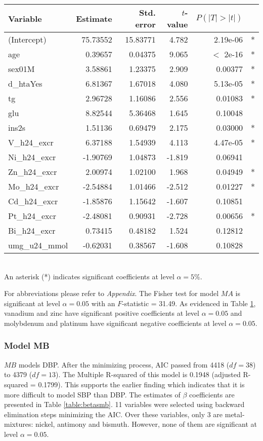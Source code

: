 \begin{table}
\centering
{}
\begin{tabular}{lrrrrl}
\toprule
Variable & Estimate & Std. error & $t$-value & $P(|T|>|t|)$& \\
\midrule
(Intercept)&  75.73552&   15.83771  & 4.782& 2.19e-06&*  \\
age       &    0.39657  &  0.04375  & 9.065 & $<$ 2e-16&* \\
sex01M     &   3.58861  &  1.23375  & 2.909  &0.00377&*  \\
d\_htaYes    &  6.81367   & 1.67018&   4.080& 5.13e-05&* \\
tg         &   2.96728 &   1.16086&   2.556 & 0.01083&*    \\
glu       &    8.82544   & 5.36468  & 1.645&  0.10048  &   \\
ins2s       &  1.51136 &   0.69479 & 2.175&  0.03000&*  \\
V\_h24\_excr &   6.37188    &1.54939 &  4.113& 4.47e-05&* \\
Ni\_h24\_excr & -1.90769   &1.04873 & -1.819&  0.06941 & \\  
Zn\_h24\_excr&   2.00974  &  1.02100 &  1.968&  0.04949&*  \\
Mo\_h24\_excr  &-2.54884&    1.01466 & -2.512 & 0.01227&* \\  
Cd\_h24\_excr & -1.85876   & 1.15642 & -1.607 & 0.10851 &\\    
Pt\_h24\_excr & -2.48081  & 0.90931  &-2.728&  0.00656 &* \\
Bi\_h24\_excr&   0.73415  &  0.48182&   1.524&  0.12812  & \\  
umg\_u24\_mmol& -0.62031 &   0.38567  &-1.608 & 0.10828 & \\   
\bottomrule
\end{tabular}
\label{table:betasma} \\
{\footnotesize An asterisk (*) indicates significant coefficients at level $\alpha=5\%$.}
\end{table}

For abbreviations please refer to \emph{Appendix}. The Fisher test for model $MA$ is significant at level $\alpha=0.05$ with an $F$-statistic = 31.49. As evidenced in Table \ref{table:betasma}, vanadium and zinc have significant positive coefficients at level $\alpha=0.05$ and molybdenum and platinum have significant negative coefficients at level $\alpha=0.05$.

\subsubsection{Model MB}
$MB$ models DBP. After the minimizing process, AIC passed from 4418 ($df=38$) to 4379 ($df=13$). The Multiple R-squared of this model is 0.1948 (adjusted R-squared = 0.1799). This supports the earlier finding which indicates that it is more difficult to model SBP than DBP. The estimates of $\beta$ coefficients are presented in Table \ref{table:betasmb}. 11 variables were selected using backward elimination steps minimizing the AIC. Over these variables, only 3 are metal-mixtures: nickel, antimony and bismuth. However, none of them are significant at level $\alpha=0.05$.

